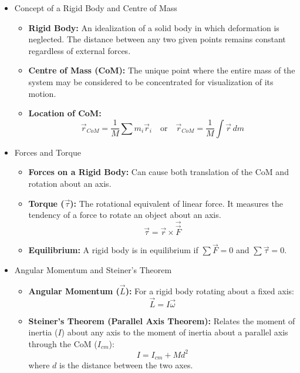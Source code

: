 \documentclass[t,aspectratio=169]{beamer}
\begin{document}
\begin{frame}
\begin{itemize}
\pagebreak
\item Concept of a Rigid Body and Centre of Mass
\begin{itemize}
    \item \textbf{Rigid Body:} An idealization of a solid body in which deformation is neglected. The distance between any two given points remains constant regardless of external forces.
    \item \textbf{Centre of Mass (CoM):} The unique point where the entire mass of the system may be considered to be concentrated for visualization of its motion.
    \item \textbf{Location of CoM:} 
    $$ \vec{r}_{CoM} = \frac{1}{M} \sum m_i \vec{r}_i \quad \text{or} \quad \vec{r}_{CoM} = \frac{1}{M} \int \vec{r} \, dm $$
  \end{itemize}

\pagebreak
\item Forces and Torque
\begin{itemize}
    \item \textbf{Forces on a Rigid Body:} Can cause both translation of the CoM and rotation about an axis.
    \item \textbf{Torque ($\vec{\tau}$):} The rotational equivalent of linear force. It measures the tendency of a force to rotate an object about an axis.
    \[ \vec{\tau} = \vec{r} \times \vec{\vec{F}} \]
    \item \textbf{Equilibrium:} A rigid body is in equilibrium if $\sum \vec{F} = 0$ and $\sum \vec{\tau} = 0$.
\end{itemize}

\pagebreak
\item Angular Momentum and Steiner's Theorem
\begin{itemize}
    \item \textbf{Angular Momentum ($\vec{L}$):} For a rigid body rotating about a fixed axis:
    \[ \vec{L} = I \vec{\omega} \]
    \item \textbf{Steiner's Theorem (Parallel Axis Theorem):} Relates the moment of inertia ($I$) about any axis to the moment of inertia about a parallel axis through the CoM ($I_{cm}$):
    \[ I = I_{cm} + Md^2 \]
    where $d$ is the distance between the two axes.
  \end{itemize}


\end{itemize}
\end{frame}
\end{document}
